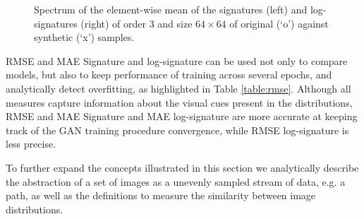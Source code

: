 \documentclass[lettersize,journal]{IEEEtran}
\begin{document}
\begin{figure*}[ht]
\centering
{}
\caption{Spectrum of the element-wise mean of the signatures (left) and log-signatures (right) of order 3 and size $64\times64$ of original (`o') against synthetic (`x') samples.}
\label{fge:19_decurto_and_dezarza}
\end{figure*}

RMSE and MAE Signature and log-signature can be used not only to compare models, but also to keep performance of training across several epochs, and analytically detect overfitting, as highlighted in Table \ref{table:rmse}. Although all measures capture information about the visual cues present in the distributions, RMSE and MAE Signature and MAE log-signature are more accurate at keeping track of the GAN training procedure convergence, while RMSE log-signature is less precise.

\setlength{\tabcolsep}{4pt}
\begin{table}[H]
\begin{center}
\caption{RMSE and MAE, SIGNATURE and LOG-SIGNATURE across several iterations of training of Stylegan2-ada (lower is better). Our synthetic samples are generated using the model $798$ which achieves the highest accuracy on RMSE and MAE, SIGNATURE and LOG-SIGNATURE.\\}
\label{table:rmse}
\end{center}
\end{table}
\setlength{\tabcolsep}{1.4pt}

To further expand the concepts illustrated in this section we analytically describe the abstraction of a set of images as a unevenly sampled stream of data, e.g. a path, as well as the definitions to measure the similarity between image distributions.
\\
\end{document}
